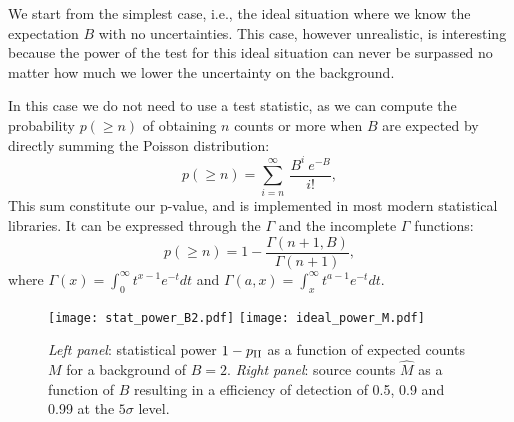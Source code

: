 \documentclass[twocolumn]{aastex61}
\begin{document}
    We start from the simplest case, i.e., the ideal situation where we know the expectation $B$ with no uncertainties. This case, however unrealistic, is interesting because the power of the test for this ideal situation can never be surpassed no matter how much we lower the uncertainty on the background.

    In this case we do not need to use a test statistic, as we can compute the probability $p(\geq n)$ of obtaining $n$ counts or more when $B$ are expected by directly summing the Poisson distribution:
$$
p(\geq n) = \sum_{i=n}^{\infty}~\frac{B^{i}~e^{-B}}{i!},
$$
This sum constitute our p-value, and is implemented in most modern statistical libraries. It can be expressed through the $\Gamma$ and the incomplete $\Gamma$ functions:
$$
p(\geq n) = 1 - \frac{\Gamma(n+1, B)}{\Gamma(n+1)},
$$
where $\Gamma(x) = \int_{0}^{\infty}t^{x-1}e^{-t}dt$ and $\Gamma(a, x) = \int_{x}^{\infty}t^{a-1}e^{-t}dt$. 

\begin{figure*}
\centering
\texttt{[image: stat\_power\_B2.pdf]}
\texttt{[image: ideal\_power\_M.pdf]}
\caption{\textit{Left panel}: statistical power $1-p_{\rm II}$ as a function of expected counts $M$ for a background of $B=2$. \textit{Right panel}: source counts $\hat{M}$ as a function of $B$ resulting in a efficiency of detection  of 0.5, 0.9 and 0.99 at the $5\sigma$ level.}
\label{fig:stat_power_B2}
\end{figure*}
\end{document}

